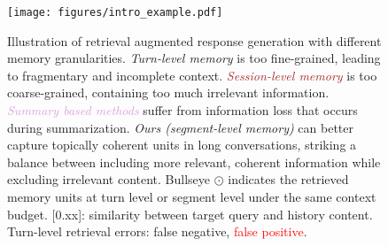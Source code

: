 \begin{figure}[!h]
    \centering
    \texttt{[image: figures/intro\_example.pdf]}
    \caption{Illustration of retrieval augmented response generation with different memory granularities. \textcolor{dark_blue}{\textit{Turn-level memory}} is too fine-grained, leading to fragmentary and incomplete context. \textcolor{brown}{\textit{Session-level memory}} is too coarse-grained, containing too much irrelevant information. \textcolor{plum}{\textit{Summary based methods}} suffer from information loss that occurs during summarization. \textcolor{dark_green}{\textit{Ours (segment-level memory)}} can better capture topically coherent units in long conversations, striking a balance between including more relevant, coherent information while excluding irrelevant content. Bullseye $\odot$ indicates the retrieved memory units at \textcolor{dark_blue}{turn level} or \textcolor{dark_green}{segment level} under the same context budget. [0.xx]: similarity between target query and history content. \textcolor{dark_blue}{Turn-level} retrieval errors: \colorbox{light_green}{\textcolor{dark_green}{false negative}}, \colorbox{light_blue}{\textcolor{red}{false positive}}.}
    \label{fig: intro_example}
\end{figure}